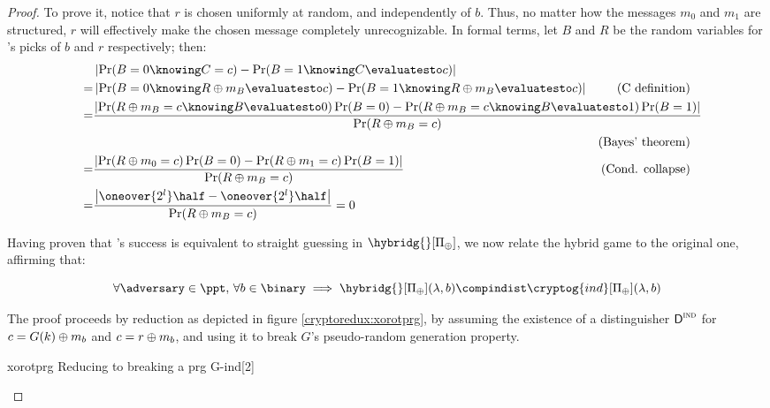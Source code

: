 \begin{proof}
    To prove it, notice that $r$ is chosen uniformly at random, and independently of $b$. Thus, no matter how the messages $m_0$ and $m_1$ are structured, $r$ will effectively make the chosen message completely unrecognizable. In formal terms, let $B$ and $R$ be the random variables for \challenger{}'s picks of $b$ and $r$ respectively; then:
    \begin{align*} %
        & \left| \Pr(B = 0 \knowing C = c) - \Pr(B = 1 \knowing C \evaluatesto c) \right| & \\
        =& \left| \Pr(B = 0 \knowing R \xor m_B \evaluatesto c) - \Pr(B = 1 \knowing R \xor m_B \evaluatesto c) \right| & \text{(C definition)} \\
        =& \mathrlap{\frac{\left| \Pr(R \xor m_B = c \knowing B \evaluatesto 0) \Pr(B = 0) - \Pr(R \xor m_B = c \knowing B \evaluatesto 1) \Pr(B = 1) \right|}{\Pr(R \xor m_B = c)}} & \\
        & & \text{(Bayes' theorem)} \\
        =& \frac{\left| \Pr(R \xor m_0 = c) \Pr(B = 0) - \Pr(R \xor m_1 = c) \Pr(B = 1) \right|}{\Pr(R \xor m_B = c)} & \text{(Cond. collapse)} \\
        =& \frac{\left| \oneover{2^l} \half - \oneover{2^l} \half \right|}{\Pr(R \xor m_B = c)} = 0 & \\
    \end{align*}

    Having proven that \adversary's success is equivalent to straight guessing in $\hybridg{}[\Pi_\xor]$, we now relate the hybrid game to the original one, affirming that:
    
    \begin{claim}
        \[
            \forall \adversary \in \ppt,\, \forall b \in \binary \implies \hybridg{}[\Pi_\xor](\lambda, b) \compindist \cryptog{ind}[\Pi_\xor](\lambda, b) \qedhere
        \]
    \end{claim}

    The proof proceeds by reduction as depicted in figure \ref{cryptoredux:xorotprg}, by assuming the existence of a distinguisher $\textsf{D}^{\textsc{ind}}$ for $c = G(k) \oplus m_{b}$ and $c = r \oplus m_{b}$, and using it to break $G$'s pseudo-random generation property.

    \begin{cryptoredux}
        {xorotprg}
        {Reducing to breaking a \prg}
        {prg}
        {G-ind}[2]



\end{cryptoredux}
\end{proof}
